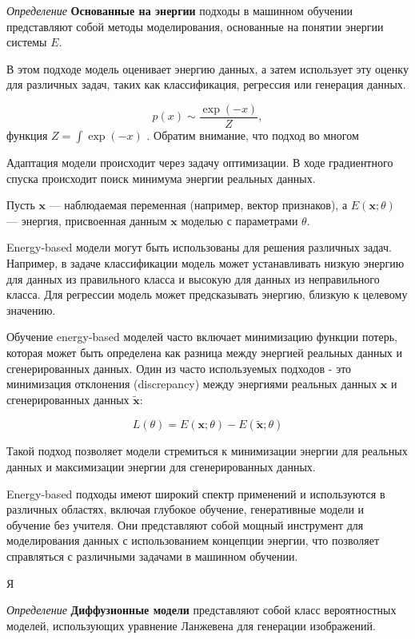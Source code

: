 \textit{Определение} \textbf{Основанные на энергии} подходы в машинном обучении представляют собой методы моделирования,
 основанные на понятии энергии системы $E$.

В этом подходе модель оценивает энергию данных, а затем использует эту оценку для различных задач, 
таких как классификация, регрессия или генерация данных.

\begin{equation}
    p(x) \sim \frac{\exp(-x)}{Z},
\end{equation}
функция $Z=\int \exp(-x)$ . Обратим внимание, что подход во многом 
 
Адаптация модели происходит через задачу оптимизации.  В ходе градиентного спуска происходит поиск минимума энергии реальных данных.


Пусть \( \mathbf{x} \) — наблюдаемая переменная (например, вектор признаков),
 а \( E(\mathbf{x}; \theta) \) — энергия, присвоенная данным \( \mathbf{x} \) моделью с параметрами \( \theta \). 

Energy-based модели могут быть использованы для решения различных задач. Например, в задаче классификации модель может устанавливать низкую энергию для данных из правильного класса и высокую для данных из неправильного класса. Для регрессии модель может предсказывать энергию, близкую к целевому значению.

Обучение energy-based моделей часто включает минимизацию функции потерь, которая может быть определена как разница между энергией реальных данных и сгенерированных данных. Один из часто используемых подходов - это минимизация отклонения (discrepancy) между энергиями реальных данных \( \mathbf{x} \) и сгенерированных данных \( \tilde{\mathbf{x}} \):

\[ L(\theta) = E(\mathbf{x}; \theta) - E(\tilde{\mathbf{x}}; \theta) \]

Такой подход позволяет модели стремиться к минимизации энергии для реальных данных и максимизации энергии для сгенерированных данных.

Energy-based подходы имеют широкий спектр применений и используются в различных областях, включая глубокое обучение, генеративные модели и обучение без учителя. Они представляют собой мощный инструмент для моделирования данных с использованием концепции энергии, что позволяет справляться с различными задачами в машинном обучении.

Я



\textit{Определение} \textbf{Диффузионные модели} \label{diffusion} представляют собой класс вероятностных моделей, 
использующих уравнение Ланжевена для генерации изображений.

